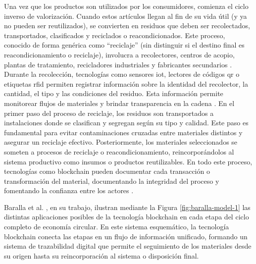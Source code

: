 Una vez que los productos son utilizados por los consumidores, comienza el ciclo inverso de valorización. Cuando estos artículos llegan al fin de su vida útil (y ya no pueden ser reutilizados), se convierten en residuos que deben ser recolectados, transportados, clasificados y reciclados o reacondicionados. Este proceso, conocido de forma genérica como ``reciclaje'' (sin distinguir si el destino final es reacondicionamiento o reciclaje), involucra a recolectores, centros de acopio, plantas de tratamiento, recicladores industriales y fabricantes secundarios \cite{cepal2021economia}. Durante la recolección, tecnologías como sensores \acrshort{iot}, lectores de códigos \acrshort{qr} o etiquetas \acrshort{rfid} permiten registrar información sobre la identidad del recolector, la cantidad, el tipo y las condiciones del residuo. Esta información permite monitorear flujos de materiales y brindar transparencia en la cadena \cite{wong2024enhancing}. En el primer paso del proceso de reciclaje, los residuos son transportados a instalaciones donde se clasifican y segregan según su tipo y calidad. Este paso es fundamental para evitar contaminaciones cruzadas entre materiales distintos y asegurar un reciclaje efectivo. Posteriormente, los materiales seleccionados se someten a procesos de reciclaje o reacondicionamiento, reincorporándolos al sistema productivo como insumos o productos reutilizables. En todo este proceso, tecnologías como blockchain pueden documentar cada transacción o transformación del material, documentando la integridad del proceso y fomentando la confianza entre los actores \cite{wong2024enhancing}.

Baralla et al. \cite{baralla2023waste}, en su trabajo, ilustran mediante la Figura \ref{fig:baralla-model-1} las distintas aplicaciones posibles de la tecnología blockchain en cada etapa del ciclo completo de economía circular. En este sistema esquemático, la tecnología blockchain conecta las etapas en un flujo de información unificado, formando un sistema de trazabilidad digital que permite el seguimiento de los materiales desde su origen hasta su reincorporación al sistema o disposición final.

